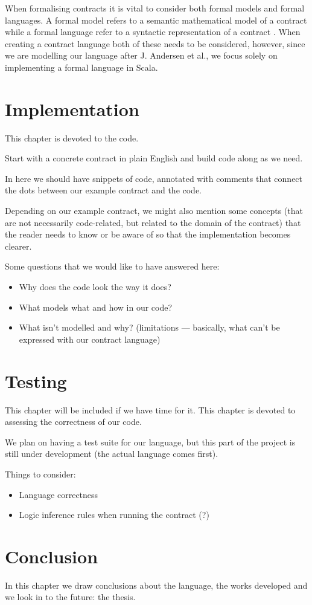 \documentclass{ituthesis}
\begin{document}
When formalising contracts it is vital to consider both formal models and formal languages. A formal model refers to a semantic mathematical model of a contract while a formal language refer to a syntactic representation of a contract \cite{hvitved2011contract}. When creating a contract language both of these needs to be considered, however, since we are modelling our language after J. Andersen et al., we focus solely on implementing a formal language in Scala.


\chapter{Implementation}
This chapter is devoted to the code.\par
Start with a concrete contract in plain English and build code along as we need.\par
In here we should have snippets of code, annotated with comments that connect the dots between our example contract and the code.\par
Depending on our example contract, we might also mention some concepts (that are not necessarily code-related, but related to the domain of the contract) that the reader needs to know or be aware of so that the implementation becomes clearer.\par
Some questions that we would like to have answered here:
\begin{itemize}
    \item Why does the code look the way it does?
    \item What models what and how in our code?
    \item What isn't modelled and why? (limitations --- basically, what can't be expressed with our contract language)
\end{itemize}


\chapter{Testing}
This chapter will be included if we have time for it.
This chapter is devoted to assessing the correctness of our code.\par
We plan on having a test suite for our language, but this part of the project is still under development (the actual language comes first).\par
Things to consider:
\begin{itemize}
    \item Language correctness
    \item Logic inference rules when running the contract (?)
\end{itemize}


\chapter{Conclusion}
In this chapter we draw conclusions about the language, the works developed and we look in to the future: the thesis.





\printbibliography
\end{document}
